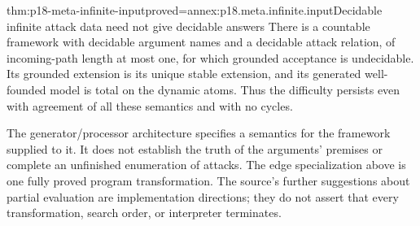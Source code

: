 \begin{hbtheorem}{thm:p18-meta-infinite-input}{proved=annex:p18.meta.infinite.input}{Decidable infinite attack data need not give decidable answers}
There is a countable framework with decidable argument names
and a decidable attack relation, of incoming-path length at
most one, for which grounded acceptance is undecidable.
Its grounded extension is its unique stable extension, and
its generated well-founded model is total on the dynamic atoms.
Thus the difficulty persists even with agreement of all these
semantics and with no cycles.
\end{hbtheorem}

The generator/processor architecture specifies a semantics for the
framework supplied to it. It does not establish the truth of the
arguments' premises or complete an unfinished enumeration of attacks.
The edge specialization above is one fully proved program
transformation. The source's further suggestions about partial
evaluation are implementation directions; they do not assert that
every transformation, search order, or interpreter terminates.
